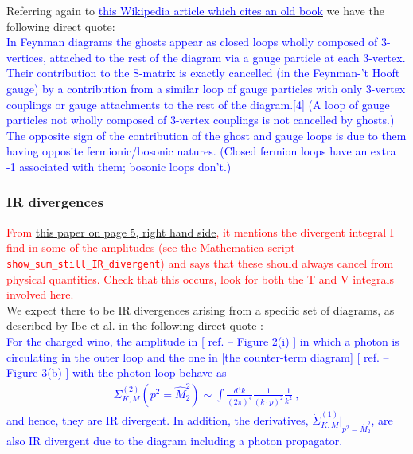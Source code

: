 \documentclass[11pt]{article}
\begin{document}
Referring again to \href{https://en.wikipedia.org/wiki/Faddeev\%E2\%80\%93Popov_ghost}{\textcolor{blue}{this Wikipedia article which cites an old book}} we have the following direct quote:\\

\textcolor{blue}{In Feynman diagrams the ghosts appear as closed loops wholly composed of 3-vertices, attached to the rest of the diagram via a gauge particle at each 3-vertex. Their contribution to the S-matrix is exactly cancelled (in the Feynman-'t Hooft gauge) by a contribution from a similar loop of gauge particles with only 3-vertex couplings or gauge attachments to the rest of the diagram.[4] (A loop of gauge particles not wholly composed of 3-vertex couplings is not cancelled by ghosts.) The opposite sign of the contribution of the ghost and gauge loops is due to them having opposite fermionic/bosonic natures. (Closed fermion loops have an extra -1 associated with them; bosonic loops don't.)}\\

\subsubsection{IR divergences}

\textcolor{red}{From \href{https://arxiv.org/pdf/hep-ph/0312092.pdf}{this paper on page 5, right hand side}, it mentions the divergent integral I find in some of the amplitudes (see the Mathematica script \lstinline{show_sum_still_IR_divergent}) and says that these should always cancel from physical quantities.  Check that this occurs, look for both the T and V integrals involved here.}\\


We expect there to be IR divergences arising from a specific set of diagrams, as described by Ibe et al. in the following direct quote \cite{Ibe2013a}:\\

\textcolor{blue}{
For the charged wino, the amplitude in [ ref. \cite{Ibe2013a} -- Figure 2(i) ] in which a photon is circulating
in the outer loop and the one in [the counter-term diagram] [ ref. \cite{Ibe2013a} -- Figure 3(b) ] with the photon loop behave as
\begin{eqnarray}
\Sigma_{K,M}^{(2)}(p^2=\hat{M}_2^2) \sim
\int \frac{d^4 k}{(2\pi)^4} \frac{1}{(k\cdot p)^2} \frac{1}{k^2} \ ,
\end{eqnarray}
and hence, they are IR divergent.
In addition, the derivatives, $\dot{\Sigma}_{K,M}^{(1)} |_{p^2=\hat{M}_2^2}$, 
are also IR divergent due to the diagram including a photon propagator. 
}\\
\end{document}
